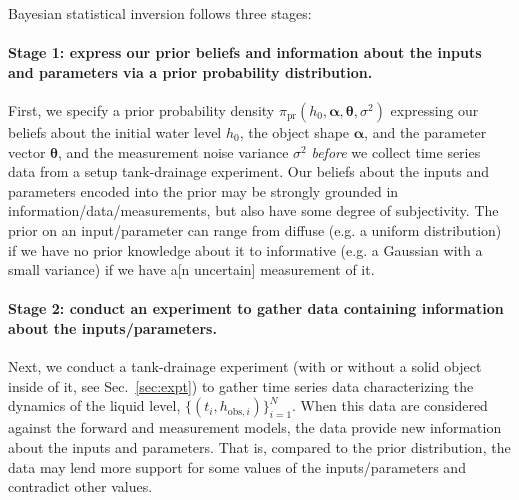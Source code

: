 \documentclass[openacc]{rsproca_new}%
\newcommand\thedata {$\{(t_i,h_{\text{obs}, i})\}_{i=1}^{N}$\xspace}
\begin{document}
Bayesian statistical inversion \cite{calvetti2018inverse,waqar2023tutorial,kaipio2006statistical}  follows three stages:

\vspace{-\baselineskip}
\paragraph{Stage 1: express our prior beliefs and information about the inputs and parameters via a prior probability distribution.}
First, we specify a prior probability density $\pi_{\text{pr}}(h_0, \boldsymbol \alpha, \boldsymbol \theta, \sigma^2)$ expressing our beliefs about the initial water level $h_0$, the object shape $\boldsymbol \alpha$, and the parameter vector $\boldsymbol \theta$, and the measurement noise variance $\sigma^2$ \emph{before} we collect time series data from a setup tank-drainage experiment.
Our beliefs about the inputs and parameters encoded into the prior may be strongly grounded in information/data/measurements, but also have some degree of subjectivity.
The prior on an input/parameter can range from diffuse (e.g. a uniform distribution) if we have no prior knowledge about it to informative (e.g. a Gaussian with a small variance) if we have a[n uncertain] measurement of it. \cite{van2021bayesian}

\vspace{-\baselineskip}
\paragraph{Stage 2: conduct an experiment to gather data containing information about the inputs/parameters.}
Next, we conduct a tank-drainage experiment (with or without a solid object inside of it, see Sec.~\ref{sec:expt}) to gather time series data characterizing the dynamics of the liquid level, \thedata. When this data are considered against the forward and measurement models, the data provide new information about the inputs and parameters. 
That is, compared to the prior distribution, the data may lend more support for some values of the inputs/parameters and contradict other values.

\vspace{-\baselineskip}
\end{document}
